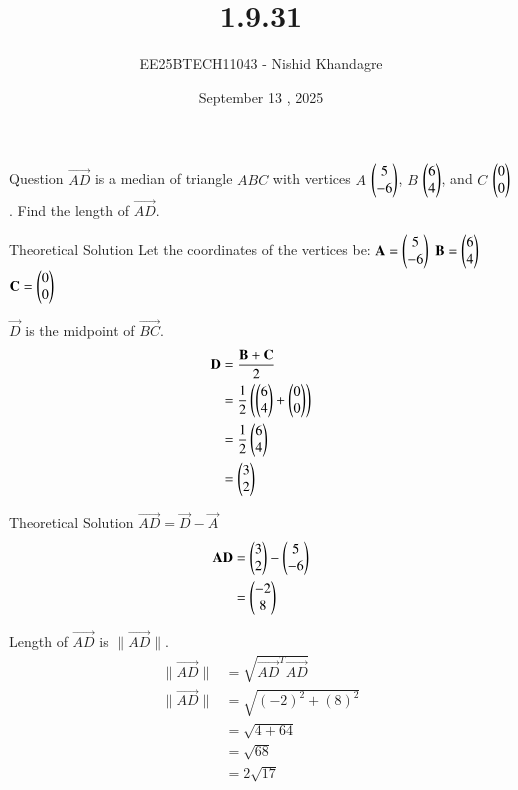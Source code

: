 \documentclass{beamer}
\title
{1.9.31}
\date{September 13 , 2025}
\author
{EE25BTECH11043 - Nishid Khandagre}
\begin{document}
\frame{\titlepage}

\begin{frame}{Question}
$\vec{AD}$ is a median of triangle $ABC$ with vertices $A$ $\begin{pmatrix} 5\\-6\end{pmatrix}$, $B$ $\begin{pmatrix} 6\\4 \end{pmatrix}$, and $C$ $\begin{pmatrix} 0\\0 \end{pmatrix}$. Find the length of $\vec{AD}$.
\end{frame}


\begin{frame}{Theoretical Solution}
Let the coordinates of the vertices be:
$\mathbf{A} = \begin{pmatrix}5 \\ -6\end{pmatrix}$
$\mathbf{B} = \begin{pmatrix}6 \\ 4\end{pmatrix}$
$\mathbf{C} = \begin{pmatrix}0 \\ 0\end{pmatrix}$

$\vec{D}$ is the midpoint of $\vec{BC}$.
\begin{align}
\mathbf{D} &= \frac{\mathbf{B} + \mathbf{C}}{2} \\
&= \frac{1}{2}\left(\begin{pmatrix}6 \\ 4\end{pmatrix} + \begin{pmatrix}0 \\ 0\end{pmatrix}\right) \\
&= \frac{1}{2}\begin{pmatrix}6 \\ 4\end{pmatrix} \\
&= \begin{pmatrix}3 \\ 2\end{pmatrix}
\end{align}
\end{frame}

\begin{frame}{Theoretical Solution}
$\vec{AD} = \vec{D} - \vec{A}$
\begin{align}
\mathbf{AD} &= \begin{pmatrix}3 \\ 2\end{pmatrix} - \begin{pmatrix}5 \\ -6\end{pmatrix} \\
&= \begin{pmatrix}-2 \\ 8\end{pmatrix}
\end{align}

Length of $\vec{AD}$ is $\|\vec{AD}\|$.
\begin{align}
\|\vec{AD}\| &= \sqrt{\vec{AD}^T\vec{AD}}\\
\|\vec{AD}\| &= \sqrt{(-2)^2 + (8)^2} \\
&= \sqrt{4 + 64} \\
&= \sqrt{68} \\
&= 2\sqrt{17}
\end{align}
\end{frame}
\end{document}
